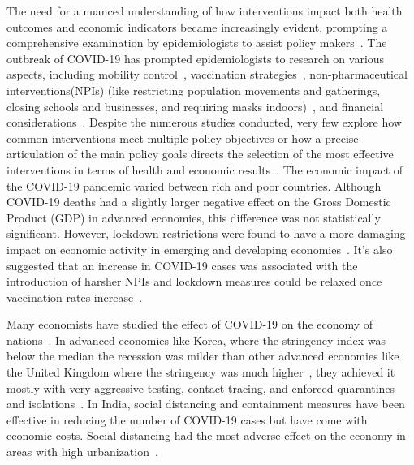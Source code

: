 \documentclass[tikz,fleqn,12pt]{wlscirep}
\begin{document}
The need for a nuanced understanding of how interventions impact both health outcomes and economic indicators became increasingly evident, prompting a comprehensive examination by epidemiologists to assist policy makers~\cite{Anderson2020}. The outbreak of COVID-19 has prompted epidemiologists to research on various aspects, including mobility control~\cite{Song2022,Chinazzi2020}, vaccination strategies~\cite{Nguyen2021, Kim2022}, non-pharmaceutical interventions(NPIs) (like restricting population movements and gatherings, closing schools and businesses, and requiring masks indoors)~\cite{Jalloh2022,Caldwell2021,Ferguson2020}, and financial considerations~\cite{DeFoo2023}. Despite the numerous studies conducted, very few explore how common interventions meet multiple policy objectives or how a precise articulation of the main policy goals directs the selection of the most effective interventions in terms of health and economic results~\cite{Hollingsworth2011, Song2022,Pangallo2023,Ash2022,Ohi2020, PADMANABHAN2021102676,NBERw26981,analytical_covid_lockdown_model}. The economic impact of the COVID-19 pandemic varied between rich and poor countries. Although COVID-19 deaths had a slightly larger negative effect on the Gross Domestic Product (GDP) in advanced economies, this difference was not statistically significant. However, lockdown restrictions were found to have a more damaging impact on economic activity in emerging and developing economies~\cite{Gagnon2023,Redlin2022,Liang2021}. It's also suggested that an increase in COVID-19 cases was associated with the introduction of harsher NPIs and lockdown measures could be relaxed once vaccination rates increase~\cite{Redlin2022,Patel2021}.

Many economists have studied the effect of COVID-19 on the economy of nations~\cite{Gagnon2023,GagnonKorea,Deb2020,Eichenbaum2021}. In advanced economies like Korea, where the stringency index was below the median the recession was milder than other advanced economies like the United Kingdom where the stringency was much higher~\cite{GagnonKorea}, they achieved it mostly with very aggressive testing, contact tracing, and enforced quarantines and isolations~\cite{Lim2023,KoreaMinister}. In India, social distancing and containment measures have been effective in reducing the number of COVID-19 cases but have come with economic costs. Social distancing had the most adverse effect on the economy in areas with high urbanization~\cite{Deb2020}.
\end{document}
